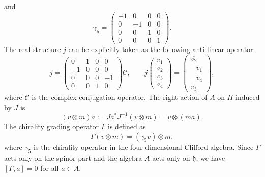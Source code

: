 \documentclass[a4paper,11pt]{article}
\begin{document}
and
\begin{equation}
  \gamma_5 = \left( \begin{array}{cccc}
    - 1 & 0 & 0 & 0\\
    0 & - 1 & 0 & 0\\
    0 & 0 & 1 & 0\\
    0 & 0 & 0 & 1
  \end{array} \right) .
\end{equation}
The real structure $j$ can be explicitly taken as the following anti-linear
operator:
\begin{equation}
  j = \left( \begin{array}{cccc}
    0 & 1 & 0 & 0\\
    - 1 & 0 & 0 & 0\\
    0 & 0 & 0 & - 1\\
    0 & 0 & 1 & 0
  \end{array} \right) \mathcal{C}, \qquad j \left( \begin{array}{c}
    v_1\\
    v_2\\
    v_3\\
    v_4
  \end{array} \right) = \left( \begin{array}{c}
    \overline{v_2}\\
    - \overline{v_1}\\
    - \overline{v_4}\\
    \overline{v_3}
  \end{array} \right),
\end{equation}
where $\mathcal{C}$ is the complex conjugation operator. The right action of
$A$ on $H$ induced by $J$ is
\begin{equation}
  (v \otimes m) a := Ja^{\ast} J^{- 1}  (v \otimes m) = v \otimes (ma) .
\end{equation}
The chirality grading operator $\Gamma$ is defined as
\begin{equation}
  \Gamma (v \otimes m) = (\gamma_5 v) \otimes m,
\end{equation}
where $\gamma_5$ is the chirality operator in the four-dimensional Clifford
algebra. Since $\Gamma$ acts only on the spinor part and the algebra $A$ acts
only on $\mathfrak{h}$, we have $[\Gamma, a] = 0$ for all $a \in A$.
\end{document}
